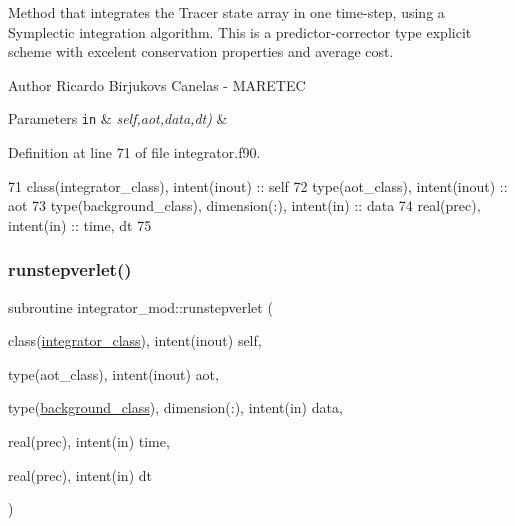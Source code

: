 Method that integrates the Tracer state array in one time-\/step, using a Symplectic integration algorithm. This is a predictor-\/corrector type explicit scheme with excelent conservation properties and average cost. 

\begin{DoxyAuthor}{Author}
Ricardo Birjukovs Canelas -\/ M\+A\+R\+E\+T\+EC 
\end{DoxyAuthor}

\begin{DoxyParams}[1]{Parameters}
\mbox{\tt in}  & {\em self,aot,data,dt)} & \\
\hline
\end{DoxyParams}


Definition at line 71 of file integrator.\+f90.


\begin{DoxyCode}
71     \textcolor{keywordtype}{class}(integrator\_class), \textcolor{keywordtype}{intent(inout)} :: self
72     \textcolor{keywordtype}{type}(aot\_class), \textcolor{keywordtype}{intent(inout)} :: aot
73     \textcolor{keywordtype}{type}(background\_class), \textcolor{keywordtype}{dimension(:)}, \textcolor{keywordtype}{intent(in)} :: data
74     \textcolor{keywordtype}{real(prec)}, \textcolor{keywordtype}{intent(in)} :: time, dt
75         
\end{DoxyCode}
\mbox{\label{namespaceintegrator__mod_af53e2642a8984c3841ae6085704f7b8d}} 
\subsubsection{\texorpdfstring{runstepverlet()}{runstepverlet()}}
{\footnotesize\ttfamily subroutine integrator\+\_\+mod\+::runstepverlet (\begin{DoxyParamCaption}\item[{class(\mbox{\hyperlink{structintegrator__mod_1_1integrator__class}{integrator\+\_\+class}}), intent(inout)}]{self,  }\item[{type(aot\+\_\+class), intent(inout)}]{aot,  }\item[{type(\mbox{\hyperlink{structbackground__mod_1_1background__class}{background\+\_\+class}}), dimension(\+:), intent(in)}]{data,  }\item[{real(prec), intent(in)}]{time,  }\item[{real(prec), intent(in)}]{dt }\end{DoxyParamCaption})\hspace{0.3cm}{\ttfamily [private]}}



